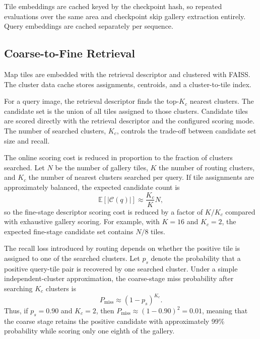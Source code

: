 \documentclass[conference]{IEEEtran}
\begin{document}
Tile embeddings are cached keyed by the checkpoint hash, so repeated
evaluations over the same area and checkpoint skip gallery extraction entirely.
Query embeddings are cached separately per sequence.

\subsection{Coarse-to-Fine Retrieval}
Map tiles are embedded with the retrieval descriptor and clustered with FAISS. The
cluster data cache stores assignments, centroids, and a cluster-to-tile index.

For a query image, the retrieval descriptor finds the top-$K_c$ nearest
clusters. The candidate set is the union of all tiles assigned to those
clusters. Candidate tiles are scored directly with the retrieval descriptor
and the configured scoring mode. The number of searched clusters, $K_c$,
controls the trade-off between candidate set size and recall.

The online scoring cost is reduced in proportion to the fraction of clusters
searched. Let $N$ be the number of gallery tiles, $K$ the number of routing
clusters, and $K_c$ the number of nearest clusters searched per query. If tile
assignments are approximately balanced, the expected candidate count is
\begin{equation}
    \mathbb{E}[|\mathcal{C}(q)|] \approx \frac{K_c}{K}N,
\end{equation}
so the fine-stage descriptor scoring cost is reduced by a factor of
$K/K_c$ compared with exhaustive gallery scoring. For example, with $K=16$
and $K_c=2$, the expected fine-stage candidate set contains $N/8$ tiles.

The recall loss introduced by routing depends on whether the positive tile is
assigned to one of the searched clusters. Let $p_s$ denote the probability
that a positive query-tile pair is recovered by one searched cluster. Under a
simple independent-cluster approximation, the coarse-stage miss probability
after searching $K_c$ clusters is
\begin{equation}
    P_{\mathrm{miss}} \approx (1-p_s)^{K_c}.
\end{equation}
Thus, if $p_s=0.90$ and $K_c=2$, then
$P_{\mathrm{miss}}\approx(1-0.90)^2=0.01$, meaning that the coarse stage
retains the positive candidate with approximately 99\% probability while
scoring only one eighth of the gallery.
\end{document}

